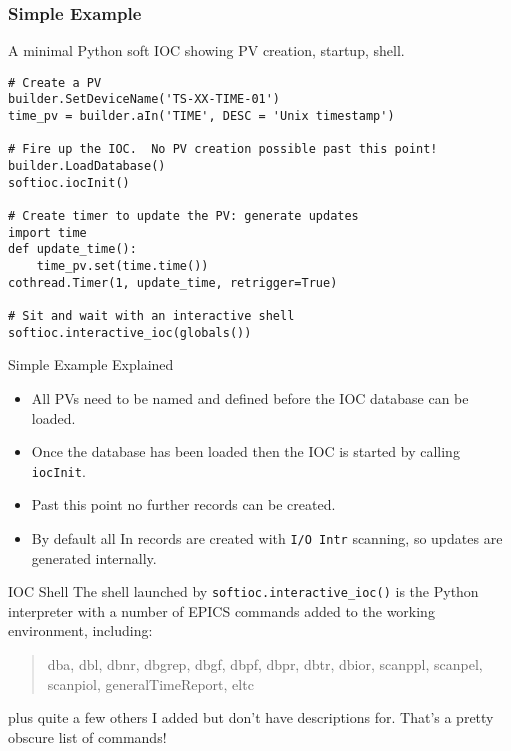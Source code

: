 \documentclass{beamer}
\begin{document}
%
\begin{frame}[fragile]\frametitle{Simple Example}

A minimal Python soft IOC showing PV creation, startup, shell.

% 
\lstset{language=Python}
\begin{lstlisting}
# Create a PV
builder.SetDeviceName('TS-XX-TIME-01')
time_pv = builder.aIn('TIME', DESC = 'Unix timestamp')

# Fire up the IOC.  No PV creation possible past this point!
builder.LoadDatabase()
softioc.iocInit()

# Create timer to update the PV: generate updates
import time
def update_time():
    time_pv.set(time.time())
cothread.Timer(1, update_time, retrigger=True)

# Sit and wait with an interactive shell
softioc.interactive_ioc(globals())
\end{lstlisting}

\end{frame}


%
\begin{frame}{Simple Example Explained}
\begin{itemize}
\item All PVs need to be named and defined before the IOC database can be
loaded.
\item Once the database has been loaded then the IOC is started by calling
\texttt{iocInit}.
\item Past this point no further records can be created.
\item By default all In records are created with \texttt{I/O Intr} scanning, so
updates are generated internally.
\end{itemize}
\end{frame}


%
\begin{frame}{IOC Shell}
The shell launched by \texttt{softioc.interactive\_ioc()} is the Python
interpreter with a number of EPICS commands added to the working environment,
including:

\begin{ttfamily}
\begin{quote}
dba, dbl, dbnr, dbgrep, dbgf, dbpf, dbpr, dbtr, dbior, scanppl, scanpel,
scanpiol, generalTimeReport, eltc
\end{quote}
\end{ttfamily}

plus quite a few others I added but don't have descriptions for.  That's a
pretty obscure list of commands!

\end{frame}
\end{document}
